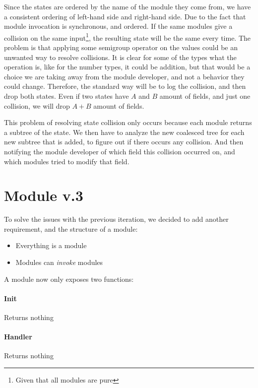 Since the states are ordered by the name of the module they come from, we
have a consistent ordering of left-hand side and right-hand side. Due to the
fact that module invocation is synchronous, and ordered. If the same modules
give a collision on the same input\footnote{Given that all modules are pure}, the
resulting state will be the same every time. The problem is that applying some
semigroup operator on the values could be an unwanted way to resolve collisions.
It is clear for some of the types what the operation is, like for the number
types, it could be addition, but that would be a choice we are taking away from
the module developer, and not a behavior they could change. Therefore, the
standard way will be to log the collision, and then drop both states. Even
if two states have $A$ and $B$ amount of fields, and just one collision, we will
drop $A + B$ amount of fields.

This problem of resolving state collision only occurs because each module
returns a subtree of the state. We then have to analyze the new coalesced tree
for each new subtree that is added, to figure out if there occurs any collision.
And then notifying the module developer of which field this collision occurred
on, and which modules tried to modify that field.


\section{Module v.3} \label{sec:moD3}

To solve the issues with the previous iteration, we decided to add another
requirement, and the structure of a module:

\begin{itemize}
  \item Everything is a module
  \item Modules can \textit{invoke} modules
\end{itemize}

A module now only exposes two functions:

\paragraph{Init} Returns nothing

\paragraph{Handler} Returns nothing

